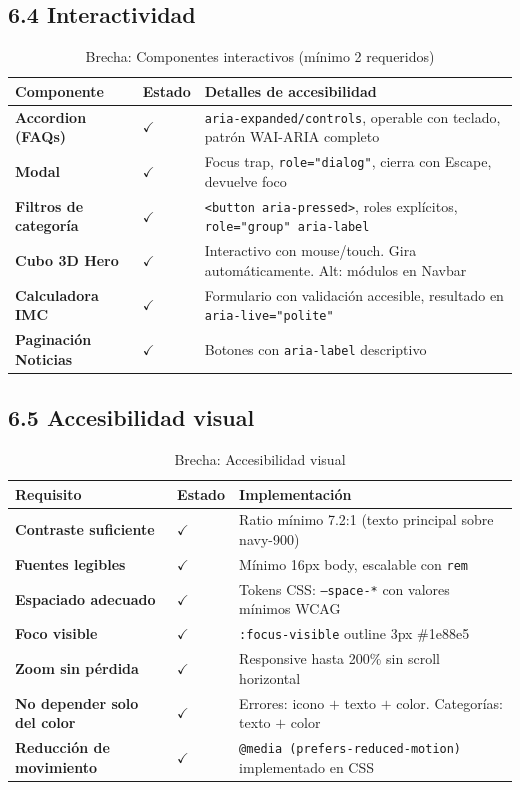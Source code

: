 \documentclass[12pt, a4paper]{article}
\newcommand{\cmark}{\textcolor{successgreen}{$\checkmark$}}
\begin{document}
\subsection{6.4 Interactividad}

\begin{table}[H]
\centering
\caption{Brecha: Componentes interactivos (mínimo 2 requeridos)}
\small
\begin{tabular}{@{}>{\bfseries}p{4cm} >{\centering\arraybackslash}p{2cm} p{7.5cm}@{}}
\toprule
\rowcolor{royalblue!12}
\textbf{Componente} & \textbf{Estado} & \textbf{Detalles de accesibilidad} \\
\midrule
Accordion (FAQs) & \cmark & \texttt{aria-expanded/controls}, operable con teclado, patrón WAI-ARIA completo \\
Modal & \cmark & Focus trap, \texttt{role="dialog"}, cierra con Escape, devuelve foco \\
Filtros de categoría & \cmark & \texttt{<button aria-pressed>}, roles explícitos, \texttt{role="group" aria-label} \\
Cubo 3D Hero & \cmark & Interactivo con mouse/touch. Gira automáticamente. Alt: módulos en Navbar \\
Calculadora IMC & \cmark & Formulario con validación accesible, resultado en \texttt{aria-live="polite"} \\
Paginación Noticias & \cmark & Botones con \texttt{aria-label} descriptivo \\
\bottomrule
\end{tabular}
\end{table}

\subsection{6.5 Accesibilidad visual}

\begin{table}[H]
\centering
\caption{Brecha: Accesibilidad visual}
\small
\begin{tabular}{@{}>{\bfseries}p{5cm} >{\centering\arraybackslash}p{2cm} p{6.5cm}@{}}
\toprule
\rowcolor{royalblue!12}
\textbf{Requisito} & \textbf{Estado} & \textbf{Implementación} \\
\midrule
Contraste suficiente & \cmark & Ratio mínimo 7.2:1 (texto principal sobre navy-900) \\
Fuentes legibles & \cmark & Mínimo 16px body, escalable con \texttt{rem} \\
Espaciado adecuado & \cmark & Tokens CSS: \texttt{--space-*} con valores mínimos WCAG \\
Foco visible & \cmark & \texttt{:focus-visible} outline 3px \#1e88e5 \\
Zoom sin pérdida & \cmark & Responsive hasta 200\% sin scroll horizontal \\
No depender solo del color & \cmark & Errores: icono $+$ texto $+$ color. Categorías: texto $+$ color \\
Reducción de movimiento & \cmark & \texttt{@media (prefers-reduced-motion)} implementado en CSS \\
\bottomrule
\end{tabular}
\end{table}
\end{document}
